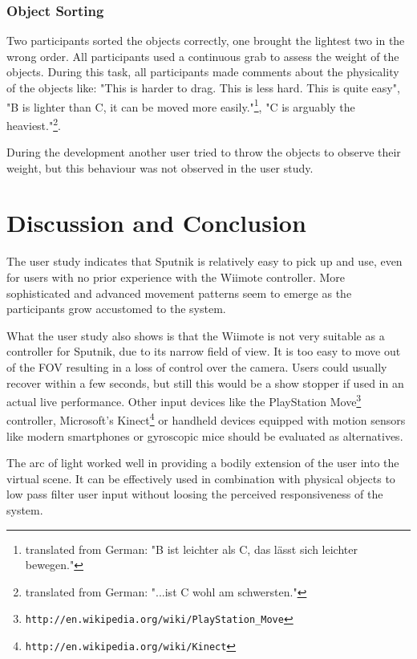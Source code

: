 \documentclass[10pt,a4paper]{scrartcl}
\begin{document}
\subsubsection{Object Sorting}
Two participants sorted the objects correctly, one brought the lightest two in the wrong order. All participants used a continuous grab to assess the weight of the objects. During this task, all participants made comments about the physicality of the objects like: "This is harder to drag. This is less hard. This is quite easy", "B is lighter than C, it can be moved more easily."\footnote{translated from German: "B ist leichter als C, das lässt sich leichter bewegen."}, "C is arguably the heaviest."\footnote{translated from German: "...ist C wohl am schwersten."}.

During the development another user tried to throw the objects to observe their weight, but this behaviour was not observed in the user study.

\section{Discussion and Conclusion}
\label{sec:discussion}

The user study indicates that Sputnik is relatively easy to pick up and use, even for users with no prior experience with the Wiimote controller. More sophisticated and advanced movement patterns seem to emerge as the participants grow accustomed to the system.

What the user study also shows is that the Wiimote is not very suitable as a controller for Sputnik, due to its narrow field of view. It is too easy to move out of the FOV resulting in a loss of control over the camera. Users could usually recover within a few seconds, but still this would be a show stopper if used in an actual live performance. Other input devices like the PlayStation Move\footnote{\texttt{http://en.wikipedia.org/wiki/PlayStation\_Move}} controller, Microsoft's Kinect\footnote{\texttt{http://en.wikipedia.org/wiki/Kinect}} or handheld devices equipped with motion sensors like modern smartphones or gyroscopic mice should be evaluated as alternatives.

The arc of light worked well in providing a bodily extension of the user into the virtual scene. It can be effectively used in combination with physical objects to low pass filter user input without loosing the perceived responsiveness of the system.
\end{document}
